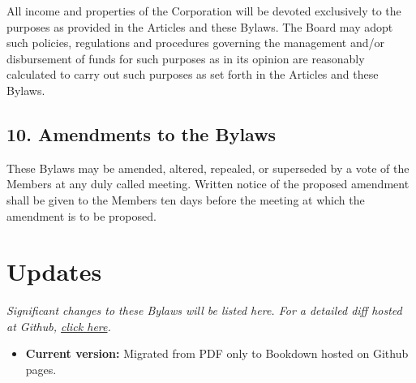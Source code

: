 \documentclass[
]{book}
\providecommand{\tightlist}{%
  \setlength{\itemsep}{0pt}\setlength{\parskip}{0pt}}
\begin{document}
All income and properties of the Corporation will be devoted exclusively to the purposes as provided in the Articles and these Bylaws. The Board may adopt such policies, regulations and procedures governing the management and/or disbursement of funds for such purposes as in its opinion are reasonably calculated to carry out such purposes as set forth in the Articles and these Bylaws.

\section*{10. Amendments to the Bylaws}\label{amendments-to-the-bylaws}

These Bylaws may be amended, altered, repealed, or superseded by a vote of the Members at any duly called meeting. Written notice of the proposed amendment shall be given to the Members ten days before the meeting at which the amendment is to be proposed.

\chapter*{Updates}\label{updates}

\emph{Significant changes to these Bylaws will be listed here. For a detailed diff hosted at Github, \href{https://github.com/Cedars-Christian-School/ccs-bylaws}{click here}.}

\begin{itemize}
\tightlist
\item
  \textbf{Current version:} Migrated from PDF only to Bookdown hosted on Github pages.
\end{itemize}
\end{document}
